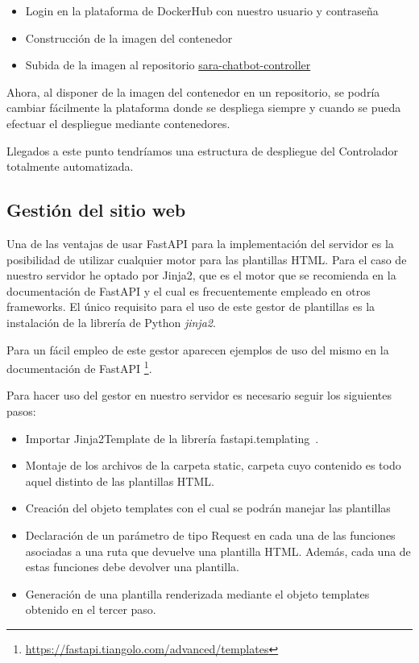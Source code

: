 \begin{itemize}
\item Login en la plataforma de DockerHub con nuestro usuario y contraseña
\item Construcción de la imagen del contenedor
\item Subida de la imagen al repositorio \href{https://hub.docker.com/repository/docker/macarse/sara-chatbot-controller}{sara-chatbot-controller}
\end{itemize}

Ahora, al disponer de la imagen del contenedor en un repositorio, se podría cambiar fácilmente la plataforma donde se despliega siempre y cuando se pueda efectuar el despliegue mediante contenedores.

Llegados a este punto tendríamos una estructura de despliegue del Controlador totalmente automatizada.


\subsection{Gestión del sitio web} \label{subsec:gest_sitio_web}

Una de las ventajas de usar FastAPI para la implementación del servidor es la posibilidad de utilizar cualquier motor para las plantillas HTML. Para el caso de nuestro servidor he optado por Jinja2, que es el motor que se recomienda en la documentación de FastAPI y el cual es frecuentemente empleado en otros frameworks. El único requisito para el uso de este gestor de plantillas es la instalación de la librería de Python \textit{jinja2}.

Para un fácil empleo de este gestor aparecen ejemplos de uso del mismo en la documentación de FastAPI \footnote{\url{https://fastapi.tiangolo.com/advanced/templates}}.

Para hacer uso del gestor en nuestro servidor es necesario seguir los siguientes pasos:

\begin{itemize}
\item Importar Jinja2Template de la librería fastapi.templating\ .
\item Montaje de los archivos de la carpeta static, carpeta cuyo contenido es todo aquel distinto de las plantillas HTML.
\item Creación del objeto templates con el cual se podrán manejar las plantillas
\item Declaración de un parámetro de tipo Request en cada una de las funciones asociadas a una ruta que devuelve una plantilla HTML. Además, cada una de estas funciones debe devolver una plantilla.
\item Generación de una plantilla renderizada mediante el objeto templates obtenido en el tercer paso.
\end{itemize}

